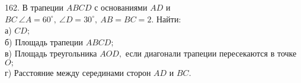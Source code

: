 162. В трапеции $ABCD$ с основаниями $AD$ и $BC\ \angle A=60^\circ,\ \angle D=30^\circ,\ AB=BC=2.$ Найти:\\
а) $CD;$\\
б) Площадь трапеции $ABCD;$\\
в) Площадь треугольника $AOD,$ если диагонали трапеции пересекаются в точке $O;$\\
г) Расстояние между серединами сторон $AD$ и $BC.$\\
